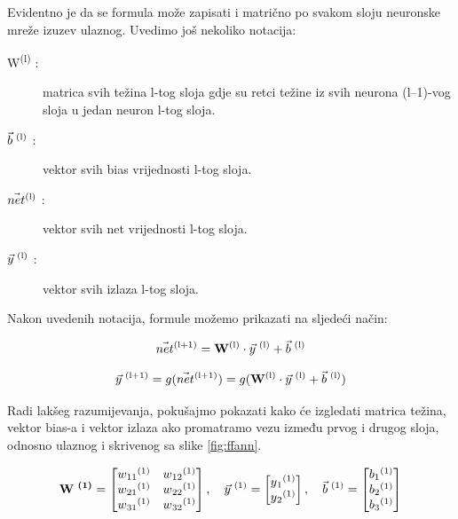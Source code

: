 \documentclass[times, utf8, zavrsni]{fer}
\begin{document}
Evidentno je da se formula može zapisati i matrično po svakom sloju neuronske mreže izuzev ulaznog. Uvedimo još nekoliko notacija:

\begin{description}
\item[W\textsuperscript{(l)} :] matrica svih težina l-tog sloja gdje su retci težine iz svih neurona (l--1)-vog sloja u jedan neuron l-tog sloja.
\item[$\Vec{b}\textsuperscript{ (l)}$ :] vektor svih bias vrijednosti l-tog sloja.
\item[$\Vec{net}\textsuperscript{(l)}$ :] vektor svih net vrijednosti l-tog sloja.
\item[$\Vec{y}\textsuperscript{ (l)}$ :] vektor svih izlaza l-tog sloja.
\end{description}

Nakon uvedenih notacija, formule možemo prikazati na sljedeći način:

\begin{equation}
    \label{eq:net-matrice}
    \text{$\Vec{net}\textsuperscript{(l+1)} = \textbf{W}\textsuperscript{(l)} \cdot \Vec{y}\textsuperscript{ (l)} + \Vec{b}\textsuperscript{ (l)}$}
\end{equation}

\begin{equation}
    \label{eq:izlaz-matrice}
    \text{$\Vec{y}\textsuperscript{ (l+1)} = g(\Vec{net}\textsuperscript{(l+1)}) = g(\textbf{W}\textsuperscript{(l)} \cdot \Vec{y}\textsuperscript{ (l)} + \Vec{b}\textsuperscript{ (l)})$}
\end{equation}

Radi lakšeg razumijevanja, pokušajmo pokazati kako će izgledati matrica težina, vektor bias-a i vektor izlaza ako promatramo vezu između prvog i drugog sloja, odnosno ulaznog i skrivenog sa slike \ref{fig:ffann}.

\[
  \textbf{W\textsuperscript{ (1)}} =
  \begin{bmatrix}
    w\textsubscript{11}\textsuperscript{(1)} & w\textsubscript{12}\textsuperscript{(1)}\\
    w\textsubscript{21}\textsuperscript{(1)} & w\textsubscript{22}\textsuperscript{(1)}\\
    w\textsubscript{31}\textsuperscript{(1)} & w\textsubscript{32}\textsuperscript{(1)}
  \end{bmatrix},\quad
  \vec{y}\textsuperscript{ (1)} = 
  \begin{bmatrix}
   y\textsubscript{1}\textsuperscript{(1)} \\
   y\textsubscript{2}\textsuperscript{(1)}
  \end{bmatrix},\quad
  \vec{b}\textsuperscript{ (1)} = 
  \begin{bmatrix}
    b\textsubscript{1}\textsuperscript{(1)} \\
    b\textsubscript{2}\textsuperscript{(1)} \\
    b\textsubscript{3}\textsuperscript{(1)}
  \end{bmatrix}
\]
\end{document}
